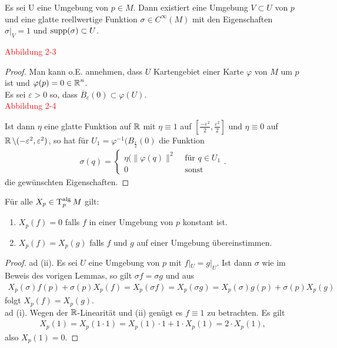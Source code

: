 \begin{lemma}
  Es sei U eine Umgebung von $p \in M$. Dann existiert eine Umgebung $V \subset U$ von $p$ und eine glatte reellwertige Funktion $\sigma \in C^{\infty}(M)$ mit den Eigenschaften $\sigma|_V = 1$ und $\operatorname{supp}(\sigma) \subset U$.
\end{lemma}

\textcolor{red}{Abbildung 2-3}


\begin{proof}
  Man kann o.E. annehmen, dass $U$ Kartengebiet einer Karte $\varphi$ von $M$ um $p$ ist und $\varphi(p) = 0 \in \operatorname{\mathbb{R}}^n$.\\

  Es sei $\varepsilon > 0$ so, dass $\overline B_c(0) \subset \varphi(U)$. \\

  \textcolor{red}{Abbildung 2-4}

  Ist dann $\eta$ eine glatte Funktion auf $\operatorname{\mathbb{R}}$ mit $\eta \equiv 1$ auf $\left[\frac{-\varepsilon^{2}}{2},\frac{\varepsilon^2}{2}\right]$ und $\eta \equiv 0$ auf $\operatorname{\mathbb{R}} \setminus (-\varepsilon^2,\varepsilon^2)$, so hat für $U_1 = \varphi^{-1}(B_{\frac{\varepsilon}{2}}(0)$ die Funktion
  \begin{align*}
    \sigma(q) =
    \begin{cases}
      \eta(\|\varphi(q)\|^2 & \text{ für } q \in U_1\\
      0 & \text{ sonst }
    \end{cases}.
  \end{align*}
  die gewünschten Eigenschaften.
\end{proof}

\begin{lemma}
  Für alle $X_p\in\operatorname{T}_p^{\text{alg}}M$ gilt:
  \begin{enumerate}
  \item $X_p(f) = 0$ falls $f$ in einer Umgebung von $p$ konstant ist.
  \item $X_p(f) = X_p(g)$ falls $f$ und $g$ auf einer Umgebung übereinstimmen.
  \end{enumerate}
\end{lemma}

\begin{proof}
  ad (ii). Es sei $U$ eine Umgebung von $p$ mit $f|_U = g|_U$. Ist dann $\sigma$ wie im Beweis des vorigen Lemmas, so gilt $\sigma f = \sigma g$ und aus
  \begin{align*}
    X_p(\sigma)f(p)+\sigma(p)X_p(f) = X_{p}(\sigma f) = X_p(\sigma g) = X_p(\sigma) g(p) + \sigma(p) X_p(g)
  \end{align*}
  folgt $X_p(f) = X_p(g)$.\\
  ad (i). Wegen der $\operatorname{\mathbb{R}}$-Linearität und (ii) genügt es $f \equiv 1$ zu betrachten. Es gilt
  \begin{align*}
    X_p(1) = X_p(1 \cdot 1) = X_p(1) \cdot 1 + 1 \cdot X_p(1) = 2 \cdot X_p(1),
  \end{align*}
  also $X_p(1) = 0$.
\end{proof}

